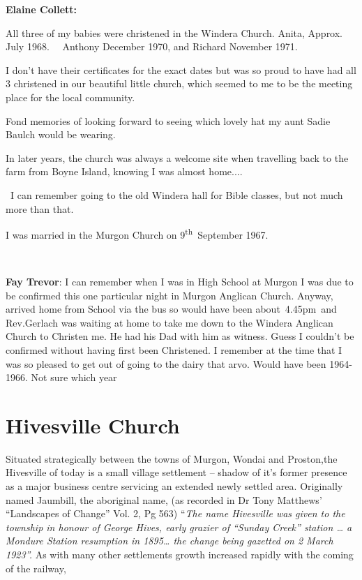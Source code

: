 \textbf{Elaine Collett:}

All three of my babies were christened in the Windera Church. Anita, Approx. July 1968.~~ Anthony December 1970, and Richard November 1971.

I don't have their certificates for the exact dates but was so proud to have had all 3 christened in our beautiful little church, which seemed to me to be the meeting place for the local community.

Fond memories of looking forward to seeing which lovely hat my aunt Sadie Baulch would be wearing.

In later years, the church was always a welcome site when travelling back to the farm from Boyne Island, knowing I was almost home....

~I can remember going to the old Windera hall for Bible classes, but not much more than that.

I was married in the Murgon Church on 9\textsuperscript{th}~September 1967.

~

\textbf{Fay Trevor}: I can remember when I was in High School at Murgon I was due to be confirmed this one particular night in Murgon Anglican Church. Anyway, arrived home from School via the bus so would have been about~4.45pm~and Rev.Gerlach was waiting at home to take me down to the Windera Anglican Church to Christen me. He had his Dad with him as witness. Guess I couldn't be confirmed without having first been Christened. I remember at the time that I was so pleased to get out of going to the dairy that arvo. Would have been 1964-1966. Not sure which year

\hypertarget{hivesville-church}{%
\section{Hivesville Church}\label{hivesville-church}}

Situated strategically between the towns of Murgon, Wondai and Proston,the Hivesville of today is a small village settlement -- shadow of it's former presence as a major business centre servicing an extended newly settled area. Originally named Jaumbill, the aboriginal name, (as recorded in Dr Tony Matthews' ``Landscapes of Change'' Vol. 2, Pg 563) ``\emph{The name Hivesville was given to the township in honour of George Hives, early grazier of ``Sunday Creek'' station \ldots{} a Mondure Station resumption in 1895\ldots{} the change being gazetted on 2 March 1923''.} As with many other settlements growth increased rapidly with the coming of the railway,

